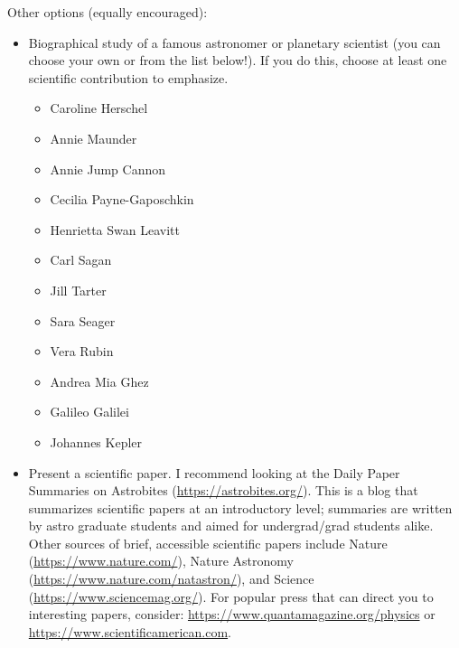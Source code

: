 \documentclass[11pt]{article}%
\begin{document}
Other options (equally encouraged):
\begin{itemize}
    \item Biographical study of a famous astronomer or planetary scientist (you can choose your own or from the list below!). If you do this, choose at least one scientific contribution to emphasize.
        \begin{itemize}[noitemsep]
            \item Caroline Herschel 
            \item Annie Maunder 
            \item Annie Jump Cannon
            \item Cecilia Payne-Gaposchkin 
            \item Henrietta Swan Leavitt
            \item Carl Sagan
            \item Jill Tarter 
            \item Sara Seager
            \item Vera Rubin
            \item Andrea Mia Ghez
            \item Galileo Galilei
            \item Johannes Kepler
        \end{itemize}
    \item Present a scientific paper.  I recommend looking at the Daily Paper
        Summaries on Astrobites (\url{https://astrobites.org/}).  This is a
        blog that summarizes scientific papers at an introductory level;
        summaries are written by astro graduate students and aimed for
        undergrad/grad students alike.
        Other sources of brief, accessible scientific papers include Nature
        (\url{https://www.nature.com/}), Nature Astronomy
        (\url{https://www.nature.com/natastron/}), and
        Science (\url{https://www.sciencemag.org/}).
        For popular press that can direct you to interesting papers, consider:
        \url{https://www.quantamagazine.org/physics} or
        \url{https://www.scientificamerican.com}.

    
\end{itemize}
\end{document}
